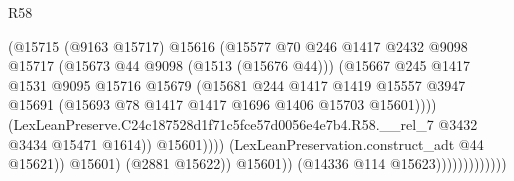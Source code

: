 \begin{lexlean}{R58}
\begin{coremodule}
{{                                              (@15715
                                                (@9163 @15717)
                                                @15616
                                                (@15577
                                                  @70
                                                  @246
                                                  @1417
                                                  @2432
                                                  @9098
                                                  @15717
                                                  (@15673 @44 @9098 (@1513 (@15676 @44)))
                                                  (@15667
                                                    @245
                                                    @1417
                                                    @1531
                                                    @9095
                                                    @15716
                                                    @15679
                                                    (@15681
                                                      @244
                                                      @1417
                                                      @1419
                                                      @15557
                                                      @3947
                                                      @15691
                                                      (@15693
                                                        @78
                                                        @1417
                                                        @1417
                                                        @1696
                                                        @1406
                                                        @15703
                                                        @15601))))
                                                (LexLeanPreserve.C24c187528d1f71c5fce57d0056e4e7b4.R58.__rel_7
                                                  @3432
                                                  @3434
                                                  @15471
                                                  @1614))
                                              @15601))))
                                      (LexLeanPreservation.construct_adt @44 @15621))
                                    @15601)
                                  (@2881 @15622))
                                @15601))
                            (@14336 @114 @15623)))))))))))))
}}
\end{coremodule}
\end{lexlean}
